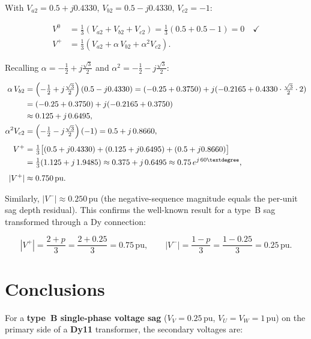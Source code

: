 \documentclass[a4paper,11pt]{article}
\begin{document}
With $V_{a2} = 0.5+j0.4330$, $V_{b2} = 0.5-j0.4330$,
$V_{c2} = -1$:

\begin{align}
V^0 &= \tfrac{1}{3}(V_{a2}+V_{b2}+V_{c2})
     = \tfrac{1}{3}(0.5+0.5-1) = 0 \quad\checkmark \\[4pt]
V^+ &= \tfrac{1}{3}(V_{a2}+\alpha\,V_{b2}+\alpha^2 V_{c2}).
\end{align}

Recalling $\alpha = -\tfrac{1}{2}+j\tfrac{\sqrt{3}}{2}$ and
$\alpha^2 = -\tfrac{1}{2}-j\tfrac{\sqrt{3}}{2}$:

\begin{align}
\alpha\,V_{b2} &= \left(-\tfrac{1}{2}+j\tfrac{\sqrt{3}}{2}\right)
                 (0.5-j0.4330)
               = (-0.25+0.3750)+j(-0.2165+0.4330\cdot\tfrac{\sqrt{3}}{2}\cdot 2)\notag\\
               &= (-0.25+0.3750)+j(-0.2165+0.3750) \notag\\
               &\approx 0.125 + j\,0.6495, \notag\\
\alpha^2 V_{c2} &= \left(-\tfrac{1}{2}-j\tfrac{\sqrt{3}}{2}\right)(-1)
                = 0.5 + j\,0.8660, \notag\\[4pt]
V^+ &= \tfrac{1}{3}\bigl[(0.5+j0.4330)+(0.125+j0.6495)+(0.5+j0.8660)\bigr] \notag\\
    &= \tfrac{1}{3}(1.125 + j\,1.9485)
     \approx 0.375 + j\,0.6495
     \approx 0.75\,e^{j\,60°}, \\[4pt]
|V^+| &\approx 0.750\,\mathrm{pu}.
\end{align}

Similarly, $|V^-| \approx 0.250\,\mathrm{pu}$ (the negative-sequence
magnitude equals the per-unit sag depth residual).  This confirms the
well-known result for a type~B sag transformed through a Dy connection:

\begin{equation}
\boxed{
|V^+| = \frac{2+p}{3} = \frac{2+0.25}{3} = 0.75\,\mathrm{pu},
\qquad
|V^-| = \frac{1-p}{3} = \frac{1-0.25}{3} = 0.25\,\mathrm{pu}.
}
\end{equation}

\section{Conclusions}
\label{sec:conclusions}

For a \textbf{type~B single-phase voltage sag} ($V_V = 0.25\,\mathrm{pu}$,
$V_U = V_W = 1\,\mathrm{pu}$) on the primary side of a \textbf{Dy11}
transformer, the secondary voltages are:
\end{document}
